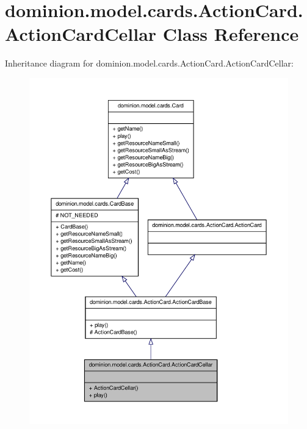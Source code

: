 \hypertarget{classdominion_1_1model_1_1cards_1_1ActionCard_1_1ActionCardCellar}{\section{dominion.\-model.\-cards.\-Action\-Card.\-Action\-Card\-Cellar \-Class \-Reference}
\label{classdominion_1_1model_1_1cards_1_1ActionCard_1_1ActionCardCellar}
}


\-Inheritance diagram for dominion.\-model.\-cards.\-Action\-Card.\-Action\-Card\-Cellar\-:
\nopagebreak
\begin{figure}[H]
\begin{center}
\leavevmode
\includegraphics[width=350pt]{classdominion_1_1model_1_1cards_1_1ActionCard_1_1ActionCardCellar__inherit__graph}
\end{center}
\end{figure}


